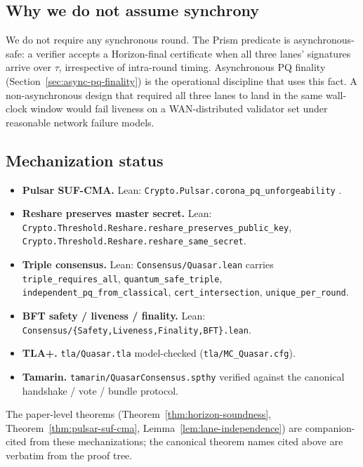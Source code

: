 \subsection{Why we do not assume synchrony}

We do not require any synchronous round. The Prism predicate is asynchronous-safe: a verifier accepts a Horizon-final certificate when all three lanes' signatures arrive over $\tau$, irrespective of intra-round timing. Asynchronous PQ finality (Section~\ref{sec:async-pq-finality}) is the operational discipline that uses this fact. A non-asynchronous design that required all three lanes to land in the same wall-clock window would fail liveness on a WAN-distributed validator set under reasonable network failure models.

\subsection{Mechanization status}

\begin{itemize}[leftmargin=2em,nosep]
  \item \textbf{Pulsar SUF-CMA.} Lean: \texttt{Crypto.Pulsar.corona\_pq\_unforgeability} \cite{leancrypto}.
  \item \textbf{Reshare preserves master secret.} Lean: \texttt{Crypto.Threshold.Reshare.reshare\_preserves\_public\_key}, \texttt{Crypto.Threshold.Reshare.reshare\_same\_secret}.
  \item \textbf{Triple consensus.} Lean: \texttt{Consensus/Quasar.lean} carries \texttt{triple\_requires\_all}, \texttt{quantum\_safe\_triple}, \texttt{independent\_pq\_from\_classical}, \texttt{cert\_intersection}, \texttt{unique\_per\_round}.
  \item \textbf{BFT safety / liveness / finality.} Lean: \texttt{Consensus/\{Safety,Liveness,Finality,BFT\}.lean}.
  \item \textbf{TLA+.} \texttt{tla/Quasar.tla} model-checked (\texttt{tla/MC\_Quasar.cfg}).
  \item \textbf{Tamarin.} \texttt{tamarin/QuasarConsensus.spthy} verified against the canonical handshake / vote / bundle protocol.
\end{itemize}

The paper-level theorems (Theorem~\ref{thm:horizon-soundness}, Theorem~\ref{thm:pulsar-suf-cma}, Lemma~\ref{lem:lane-independence}) are companion-cited from these mechanizations; the canonical theorem names cited above are verbatim from the proof tree.
